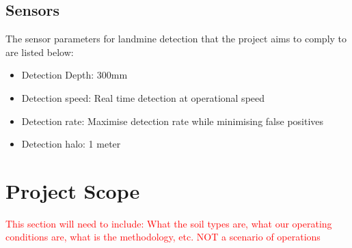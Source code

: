 \documentclass[main.tex]{subfiles}
\begin{document}
\subsection{Sensors}
The sensor parameters for landmine detection that the project aims to comply to are listed below:
\begin{itemize}
\item Detection Depth: 300mm 
\item Detection speed: Real time detection at operational speed
\item Detection rate: Maximise detection rate while minimising false positives
\item Detection halo: 1 meter %
\end{itemize}

\section{Project Scope}
\textcolor{red}{This section will need to include: What the soil types are, what our operating conditions are, what is the methodology, etc. NOT a scenario of operations}
\end{document}
